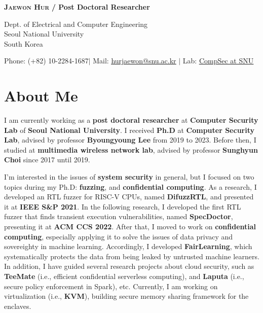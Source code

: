 \documentclass[letterpaper,11pt]{article}
\begin{document}


\begin{center}
    \textbf{\Huge \scshape Jaewon Hur} \textbf{ /  Post Doctoral Researcher} \\ \vspace{10pt}
    
    Dept. of Electrical and Computer Engineering \\
    Seoul National University \\
    South Korea \\ \vspace{10pt}
    
    \small Phone: (+82) 10-2284-1687$|$ Mail: \href{mailto:hurjaewon@snu.ac.kr}{\underline{hurjaewon@snu.ac.kr}} $|$ 
    Lab: \href{https://compsec.snu.ac.kr}{\underline{CompSec at SNU}}
\end{center}

\vspace{15pt}
\section{About Me}

I am currently working as a \textbf{post doctoral researcher} at \textbf{Computer Security Lab} of \textbf{Seoul National University}. I received \textbf{Ph.D} at \textbf{Computer Security Lab}, advised by professor \textbf{Byoungyoung Lee} from 2019 to 2023. Before then, I studied at \textbf{multimedia wireless network lab}, advised by professor \textbf{Sunghyun Choi} since 2017 until 2019.

I'm interested in the issues of \textbf{system security} in general, but I focused on two topics during my Ph.D: \textbf{fuzzing}, and \textbf{confidential computing}. As a research, I developed an RTL fuzzer for RISC-V CPUs, named \textbf{DifuzzRTL}, and presented it at \textbf{IEEE S\&P 2021}. In the following research, I developed the first RTL fuzzer that finds transient execution vulnerabilities, named \textbf{SpecDoctor}, presenting it at \textbf{ACM CCS 2022}. After that, I moved to work on \textbf{confidential computing}, especially applying it to solve the issues of data privacy and sovereighty in machine learning. Accordingly, I developed \textbf{FairLearning}, which systematically protects the data from being leaked by untrusted machine learners. In addition, I have guided several research projects about cloud security, such as \textbf{TeeMate} (i.e., efficient confidential serverless computing), and \textbf{Laputa} (i.e., secure policy enforcement in Spark), etc. Currently, I am working on virtualization (i.e., \textbf{KVM}), building secure memory sharing framework for the enclaves.
\end{document}
